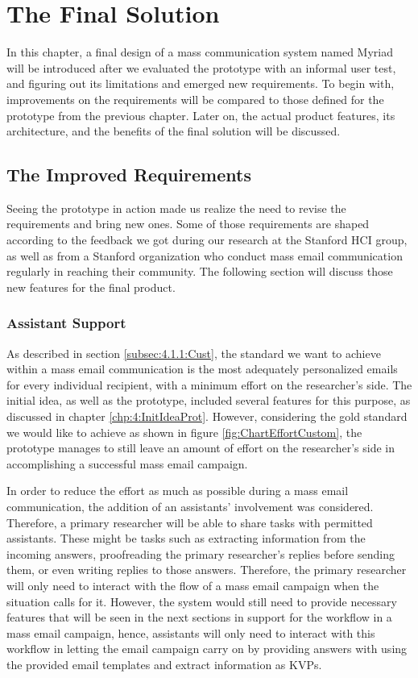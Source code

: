 \chapter{The Final Solution}
\label{chp:5:FinaSolu}
In this chapter, a final design of a mass communication system named Myriad will be introduced after we evaluated the prototype with an informal user test, and figuring out its limitations and emerged new requirements. To begin with, improvements on the requirements will be compared to those defined for the prototype from the previous chapter. Later on, the actual product features, its architecture, and the benefits of the final solution will be discussed.

\section{The Improved Requirements}
\label{sec:5.1:ImprRequ}

Seeing the prototype in action made us realize the need to revise the requirements and bring new ones. Some of those requirements are shaped according to the feedback we got during our research at the Stanford \ac{HCI} group, as well as from a Stanford organization who conduct mass email communication regularly in reaching their community. The following section will discuss those new features for the final product.

\subsection{Assistant Support}
\label{subsec:5.1.1:AssiSupp}
As described in section \ref{subsec:4.1.1:Cust}, the standard we want to achieve within a mass email communication is the most adequately personalized emails for every individual recipient, with a minimum effort on the researcher's side. The initial idea, as well as the prototype, included several features for this purpose, as discussed in chapter \ref{chp:4:InitIdeaProt}. However, considering the gold standard we would like to achieve as shown in figure \ref{fig:ChartEffortCustom}, the prototype manages to still leave an amount of effort on the researcher's side in accomplishing a successful mass email campaign.
\vspace{1cm}

In order to reduce the effort as much as possible during a mass email communication, the addition of an assistants' involvement was considered. Therefore, a primary researcher will be able to share tasks with permitted assistants. These might be tasks such as extracting information from the incoming answers, proofreading the primary researcher's replies before sending them, or even writing replies to those answers. Therefore, the primary researcher will only need to interact with the flow of a mass email campaign when the situation calls for it. However, the system would still need to provide necessary features that will be seen in the next sections in support for the workflow in a mass email campaign, hence, assistants will only need to interact with this workflow in letting the email campaign carry on by providing answers with using the provided email templates and extract information as \ac{KVP}s.

